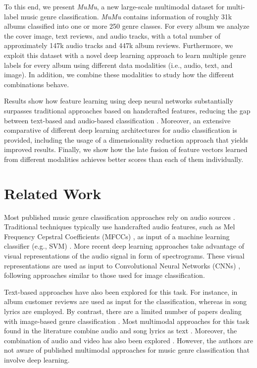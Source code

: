\documentclass{article}
\begin{document}
To this end, we present \emph{MuMu}, a new large-scale multimodal dataset for multi-label music genre classification. \emph{MuMu} contains information of roughly 31k albums classified into one or more 250 genre classes. For every album we analyze the cover image, text reviews, and audio tracks, with a total number of approximately 147k audio tracks and 447k album reviews. 
Furthermore, we exploit this dataset with a novel deep learning approach to learn multiple genre labels for every album using different data modalities (i.e., audio, text, and image). 
In addition, we combine these modalities to study how the different combinations behave.

Results show how feature learning using deep neural networks substantially surpasses traditional approaches based on handcrafted features, reducing the gap between text-based and audio-based classification \cite{oramas2016exploring}.
Moreover, an extensive comparative of different deep learning architectures for audio classification is provided, including the usage of a dimensionality reduction approach that yields improved results. 
Finally, we show how the late fusion of feature vectors learned from different modalities achieves better scores than each of them individually.



\section{Related Work}\label{sec:related}

Most published music genre classification approaches rely on audio sources \cite{sturm2012survey,bogdanov2016cross}. 
Traditional techniques typically use handcrafted audio features, such as Mel Frequency Cepstral Coeﬃcients (MFCCs) \cite{logan2000mel}, as input of a machine learning classifier (e.g., SVM) \cite{tzanetakis2002musical,seyerlehner2010using}.
More recent deep learning approaches take advantage of visual representations of the audio signal in form of spectrograms.
These visual representations are used as input to Convolutional Neural Networks (CNNs) \cite{dieleman2011audio,dieleman2014end,pons2016experimenting,Choi2016,choi2016convolutional}, following approaches similar to those used for image classification.

Text-based approaches have also been explored for this task. 
For instance, in \cite{hu2005mining,oramas2016exploring} album customer reviews are used as input for the classification, whereas in \cite{mayer2008rhyme,choi2014song} song lyrics are employed.
By contrast, there are a limited number of papers dealing with image-based genre classification \cite{libeks2011you}.
Most multimodal approaches for this task found in the literature combine audio and song lyrics as text \cite{laurier2008multimodal,neumayer2007integration}. 
Moreover, the combination of audio and video has also been explored \cite{schindler2015audio}. 
However, the authors are not aware of published multimodal approaches for music genre classification that involve deep learning. 
\end{document}
